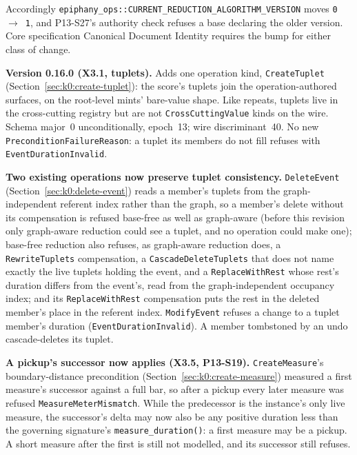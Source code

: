 \documentclass[11pt,letterpaper]{report}
\newcommand{\sectionsc}[1]{{\addfontfeatures{Letters=SmallCaps}#1}}
\begin{document}
\noindent Accordingly
\texttt{epiphany\_ops::CURRENT\_REDUCTION\_ALGORITHM\_VERSION} moves
\texttt{0}~$\rightarrow$~\texttt{1}, and P13-S27's authority check refuses a
base declaring the older version. Core specification \sectionsc{Canonical
Document Identity} requires the bump for either class of change.

\medskip

\noindent\textbf{Version 0.16.0 (X3.1, tuplets).} Adds one operation kind,
\texttt{CreateTuplet} (Section~\ref{sec:k0:create-tuplet}): the score's tuplets
join the operation-authored surfaces, on the root-level mints' bare-value
shape. Like repeats, tuplets live in the cross-cutting registry but are not
\texttt{CrossCuttingValue} kinds on the wire. Schema major~0 unconditionally,
epoch~13; wire discriminant~40. No new \texttt{PreconditionFailureReason}: a
tuplet its members do not fill refuses with \texttt{EventDurationInvalid}.

\textbf{Two existing operations now preserve tuplet consistency.}
\texttt{DeleteEvent} (Section~\ref{sec:k0:delete-event}) reads a member's
tuplets from the graph-independent referent index rather than the graph, so a
member's delete without its compensation is refused base-free as well as
graph-aware (before this revision only graph-aware reduction could see a
tuplet, and no operation could make one); base-free reduction also refuses,
as graph-aware reduction does, a \texttt{RewriteTuplets} compensation, a
\texttt{CascadeDeleteTuplets} that does not name exactly the live tuplets
holding the event, and a \texttt{ReplaceWithRest} whose rest's duration
differs from the event's, read from the graph-independent occupancy index;
and its \texttt{ReplaceWithRest} compensation puts the rest in the deleted
member's place in the referent index.
\texttt{ModifyEvent} refuses a change to a tuplet member's duration
(\texttt{EventDurationInvalid}). A member tombstoned by an undo
cascade-deletes its tuplet.

\textbf{A pickup's successor now applies (X3.5, P13-S19).}
\texttt{CreateMeasure}'s boundary-distance precondition
(Section~\ref{sec:k0:create-measure}) measured a first measure's successor
against a full bar, so after a pickup every later measure was refused
\texttt{MeasureMeterMismatch}. While the predecessor is the instance's only
live measure, the successor's delta may now also be any positive duration less
than the governing signature's \texttt{measure\_duration()}: a first measure may
be a pickup. A short measure after the first is still not modelled, and its
successor still refuses.
\end{document}
